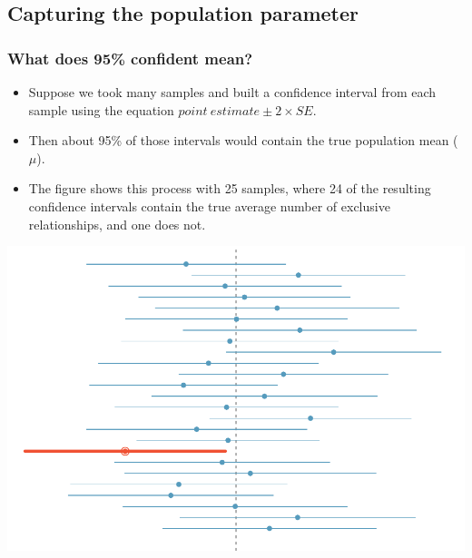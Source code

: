
\subsection{Capturing the population parameter}


\begin{frame}
\frametitle{What does 95\% confident mean?}

\begin{itemize}

\item Suppose we took many samples and built a confidence interval from each sample using the equation $point~estimate \pm 2 \times SE$.

\item Then about 95\% of those intervals would contain the true population mean ($\mu$). 

\end{itemize}

{
\begin{itemize}

\item The figure shows this process with 25 samples, where 24 of the resulting confidence intervals contain the true average number of exclusive relationships, and one does not.

\end{itemize}
}
{
\includegraphics[width=\textwidth]{4-2_conf_int/figures/95PercentConfidenceInterval/95PercentConfidenceInterval}
}

\end{frame}

